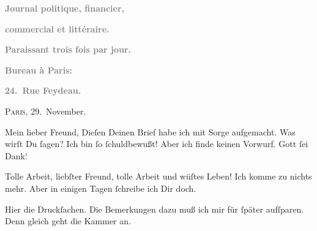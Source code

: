 \pstart
           \begin{otherlanguage}{french}\textcolor{gray}{\textbf{Journal politique, financier,}}\end{otherlanguage}\pend
           
\pstart
           \begin{otherlanguage}{french}\textcolor{gray}{\textbf{commercial et littéraire.}}\end{otherlanguage}\pend
           
\pstart
           \begin{otherlanguage}{french}\textcolor{gray}{\textbf{\textbf{Paraissant trois fois par jour.}}}\end{otherlanguage}\pend
           
\pstart
           \begin{otherlanguage}{french}\textcolor{gray}{\textbf{\textbf{Bureau à Paris:}}}\end{otherlanguage}\pend
           
\pstart
           \begin{otherlanguage}{french}\textcolor{gray}{\textbf{\textbf{24. Rue Feydeau.}}}\end{otherlanguage}\hfill \textsc{Paris}, 29. November.\pend
           
\pstart\center{}Mein lieber Freund,\pend\vspace{0.5em}
\pstart
           Dieſen Deinen Brief habe ich mit Sorge aufgemacht. Was wirſt Du{ }ſagen? Ich bin{ }ſo{ }ſchuldbewußt! Aber ich finde keinen Vorwurf. Gott{ }ſei Dank\textcolor{gray}{!}\pend
           
\pstart
           Tolle Arbeit, liebſter Freund, tolle Arbeit und wüſtes Leben! Ich komme zu nichts
               mehr. Aber in einigen Tagen{ }ſchreibe ich Dir doch.\pend
           
\pstart
           Hier die Druckſachen. Die Bemerkungen dazu muß ich mir für{ }ſpäter aufſparen. Denn
               gleich geht die Kammer an.\pend
           
